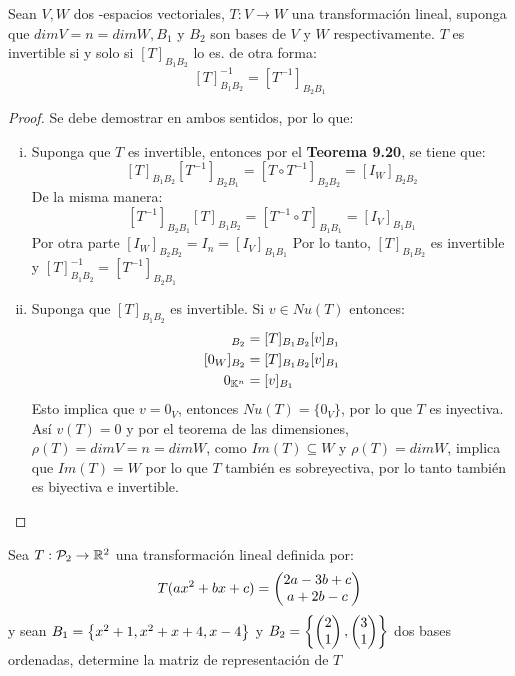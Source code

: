 \begin{theorem}
Sean $V,W$ dos \dobleK-espacios vectoriales, $T: V \to W$ una transformación lineal, suponga que $dimV = n = dimW, B_1$ y $B_2$ son bases de $V$ y $W$ respectivamente. $T$ es invertible si y solo si $[T]_{B_1 B_2}$ lo es. de otra forma:
$$[T]^{-1}_{B_1 B_2} = [T^{-1}]_{B_2 B_1}$$
\end{theorem}
\begin{proof}
Se debe demostrar en ambos sentidos, por lo que:
\begin{enumerate}[i.]
    \item Suponga que $T$ es invertible, entonces por el \textbf{Teorema 9.20}, se tiene que:
    $$[T]_{B_1 B_2} [T^{-1}]_{B_2 B_1} = [T \circ T^{-1}]_{B_2 B_2} = [I_W]_{B_2 B_2}$$
    De la misma manera:
    $$[T^{-1}]_{B_2 B_1} [T]_{B_1 B_2}  = [T^{-1} \circ T]_{B_1 B_1} = [I_V]_{B_1 B_1}$$
    Por otra parte $[I_W]_{B_2 B_2} = I_n = [I_V]_{B_1 B_1}$
    Por lo tanto, $[T]_{B_1 B_2}$ es invertible y $[T]^{-1}_{B_1 B_2} = [T^{-1}]_{B_2 B_1}$
    \item Suponga que $[T]_{B_1 B_2}$ es invertible. Si $v \in Nu(T)$ entonces:
    \begin{align*}
        [T(v)]_{B_2} &= [T]_{B_1 B_2}[v]_{B_1}\\
        [0_W]_{B_2} &= [T]_{B_1 B_2}[v]_{B_1}\\
        0_{\dobleK^n} &= [v]_{B_1} 
    \end{align*}
    Esto implica que $v = 0_V$, entonces $Nu(T) = \{0_V\}$, por lo que $T$ es inyectiva.\\
    Así $v(T) = 0$ y por el teorema de las dimensiones, $\rho(T) = dimV = n = dimW$, como $Im(T) \subseteq W$ y $\rho(T) = dimW$, implica que $Im(T) = W$ por lo que $T$ también es sobreyectiva, por lo tanto también es biyectiva e invertible.
\end{enumerate}
\end{proof}

\begin{ejemplo}
Sea $T: \mathcal{P}_2 \to \mathbb{R}^2$ una transformación lineal definida por:
$$T(ax^2 + bx + c) = \begin{pmatrix} 2a-3b+c\\ a+2b-c\\ \end{pmatrix} $$
y sean $B_1 =  \left\{x^2 +1, x^2 + x +4, x-4 \right\} $ y $B_2 =  \left\{\begin{pmatrix} 2\\ 1\\ \end{pmatrix} ,\begin{pmatrix} 3\\ 1\\ \end{pmatrix}  \right\} $ dos bases ordenadas, determine la matriz de representación de $T$
\end{ejemplo}

